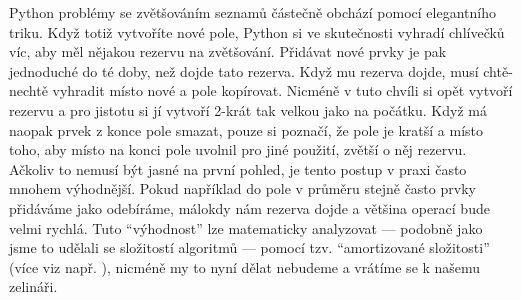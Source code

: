 \begin{center}
\begin{minipage}{5cm}
\end{minipage}
\end{center}


Python problémy se zvětšováním seznamů částečně obchází pomocí elegantního triku. Když totiž vytvoříte nové pole, Python si ve skutečnosti vyhradí chlívečků víc,
aby měl nějakou rezervu na zvětšování. Přidávat nové prvky je pak jednoduché do té doby, než dojde tato rezerva. Když mu rezerva dojde, musí chtě-nechtě
vyhradit místo nové a pole kopírovat. Nicméně v tuto chvíli si opět vytvoří rezervu a pro jistotu si jí vytvoří 2-krát tak velkou jako na počátku.
Když má naopak prvek z konce pole smazat, pouze si poznačí, že pole je kratší a místo toho, aby místo na konci pole uvolnil pro jiné použití,
zvětší o něj rezervu. Ačkoliv to nemusí být jasné na první pohled, je tento postup v praxi často mnohem výhodnější. Pokud například do pole v průměru stejně 
často prvky přidáváme jako odebíráme, málokdy nám rezerva dojde a většina operací bude velmi rychlá. Tuto ``výhodnost'' lze matematicky analyzovat ---
podobně jako jsme to udělali se složitostí algoritmů --- pomocí tzv. ``amortizované složitosti'' (více viz např. \cite{Tarjan:1985}), nicméně my to nyní
dělat nebudeme a vrátíme se k našemu zelináři.

